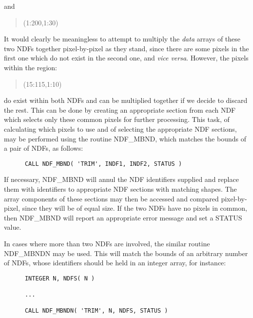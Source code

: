 \documentclass[twoside,11pt]{article}
\newcommand{\htmlref}[2]{#1}
\newcommand{\st}[1]{{\em{#1}}}
\begin{document}
and

\small
\begin{quote}
\begin{center}
(1:200,1:30)
\end{center}
\end{quote}
\normalsize

It would clearly be meaningless to attempt to multiply the \st{data\/} arrays
of these two NDFs together pixel-by-pixel as they stand, since there are
some pixels in the first one which do not exist in the second one, and \st{vice versa}. 
However, the pixels within the region:

\small
\begin{quote}
\begin{center}
(15:115,1:10)
\end{center}
\end{quote}
\normalsize

do exist within both NDFs and can be multiplied together if we decide to 
discard the rest.
This can be done by creating an appropriate section from each NDF which 
selects only these common pixels for further processing.
This task, of calculating which pixels to use and of selecting the
appropriate NDF sections, may be performed using the routine \htmlref{NDF\_MBND}{NDF_MBND},
which matches the bounds of a pair of NDFs, as follows: 

\small
\begin{verbatim}
      CALL NDF_MBND( 'TRIM', INDF1, INDF2, STATUS )
\end{verbatim}
\normalsize

If necessary, NDF\_MBND will annul the NDF identifiers supplied and replace
them with identifiers to appropriate NDF sections with matching shapes. 
The array components of these sections may then be accessed and compared
pixel-by-pixel, since they will be of equal size. 
If the two NDFs have no pixels in common, then NDF\_MBND will report an
appropriate error message and set a STATUS value. 

In cases where more than two NDFs are involved, the similar routine 
\htmlref{NDF\_MBNDN}{NDF_MBNDN} may be used.
This will match the bounds of an arbitrary number of NDFs, whose
identifiers should be held in an integer array, for instance:

\small
\begin{verbatim}
      INTEGER N, NDFS( N )

      ...

      CALL NDF_MBNDN( 'TRIM', N, NDFS, STATUS )
\end{verbatim}
\normalsize
\end{document}
